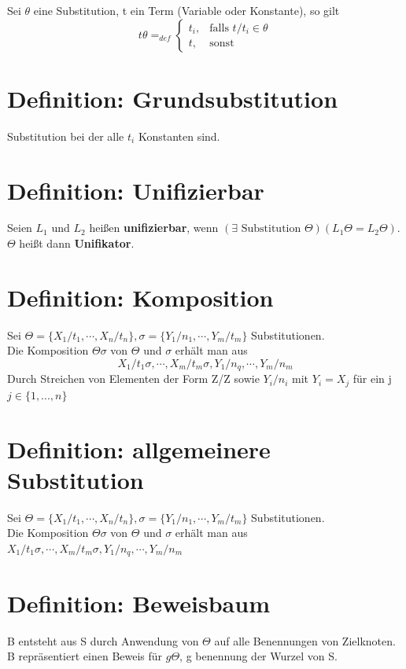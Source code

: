 \documentclass[12pt, a4paper]{article}
\begin{document}
Sei $\theta$ eine Substitution, t ein Term (Variable oder Konstante), so gilt \\

\begin{equation}
t\theta =_{def} \begin{cases} t_i, & \mbox{falls } t/t_i \in \theta \\ t, & \mbox{sonst} \end{cases}
\end{equation}

\section*{Definition: Grundsubstitution}
Substitution bei der alle $t_i$ Konstanten sind.

\section*{Definition: Unifizierbar}
Seien $L_1$ und $L_2$ heißen \textbf{unifizierbar}, wenn $(\exists \text{ Substitution } \Theta)(L_1\Theta = L_2\Theta)$. $\Theta$ heißt dann \textbf{Unifikator}.

\section*{Definition: Komposition}
Sei $\Theta = \{ X_1 / t_1, \cdots, X_n / t_n \}, \sigma = \{ Y_1 / n_1, \cdots, Y_m / t_m \}$ Substitutionen. \\
Die Komposition $\Theta\sigma$ von $\Theta$ und $\sigma$ erhält man aus 
\begin{equation}
X_1 / t_1\sigma, \cdots, X_m / t_m\sigma, Y_1 / n_q, \cdots, Y_m / n_m
\end{equation}
Durch Streichen von Elementen der Form Z/Z sowie $Y_i / n_i$ mit $Y_i = X_j$ für ein j$j \in \{1, ..., n\}$

\section*{Definition: allgemeinere Substitution}
Sei $\Theta = \{ X_1 / t_1, \cdots, X_n / t_n \}, \sigma = \{ Y_1 / n_1, \cdots, Y_m / t_m \}$ Substitutionen. \\

Die Komposition $\Theta\sigma$ von $\Theta$ und $\sigma$ erhält man aus $X_1 / t_1\sigma, \cdots, X_m / t_m\sigma, Y_1 / n_q, \cdots, Y_m / n_m$

\section*{Definition: Beweisbaum}
B entsteht aus S durch Anwendung von $\Theta$ auf alle Benennungen von Zielknoten. B repräsentiert einen Beweis für $g\Theta$, g benennung der Wurzel von S.
\end{document}
